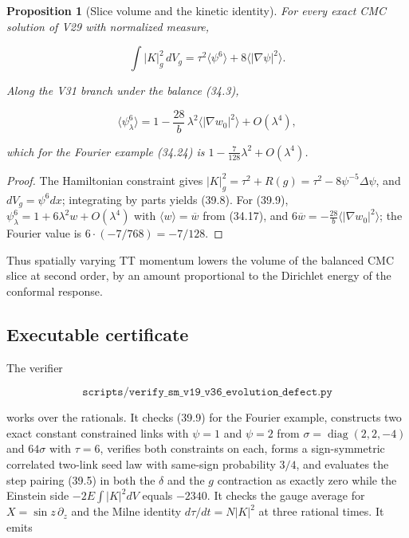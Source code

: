 \documentclass[11pt]{article}
\newtheorem{proposition}[theorem]{Proposition}
\theoremstyle{remark}
\begin{document}
\begin{proposition}[Slice volume and the kinetic identity]
\label{prop:v19v36-volume}
For every exact CMC solution of V29 with normalized measure,

\[
 \int|K|_g^2\,dV_g=\tau^2\langle\psi^6\rangle+8\langle|\nabla\psi|^2\rangle.
                                                                    \tag{39.8}
\]

Along the V31 branch under the balance (34.3),

\[
 \langle\psi_\lambda^6\rangle
 =1-\frac{28}{b}\,\lambda^2\bigl\langle|\nabla w_0|^2\bigr\rangle+O(\lambda^4),
                                                                    \tag{39.9}
\]

which for the Fourier example (34.24) is \(1-\tfrac7{128}\lambda^2+O(\lambda^4)\).
\end{proposition}

\begin{proof}
The Hamiltonian constraint gives
\(|K|_g^2=\tau^2+R(g)=\tau^2-8\psi^{-5}\Delta\psi\), and
\(dV_g=\psi^6dx\); integrating by parts yields (39.8).  For (39.9),
\(\psi_\lambda^6=1+6\lambda^2w+O(\lambda^4)\) with
\(\langle w\rangle=\overline w\) from (34.17), and
\(6\overline w=-\tfrac{28}b\langle|\nabla w_0|^2\rangle\); the Fourier
value is \(6\cdot(-7/768)=-7/128\).
\end{proof}

Thus spatially varying TT momentum lowers the volume of the balanced CMC
slice at second order, by an amount proportional to the Dirichlet energy
of the conformal response.

\subsection{Executable certificate}

The verifier

\[
 \texttt{scripts/verify\_sm\_v19\_v36\_evolution\_defect.py}       \tag{39.10}
\]

works over the rationals.  It checks (39.9) for the Fourier example,
constructs two exact constant constrained links with \(\psi=1\) and
\(\psi=2\) from \(\sigma=\operatorname{diag}(2,2,-4)\) and
\(64\sigma\) with \(\tau=6\), verifies both constraints on each, forms a
sign-symmetric correlated two-link seed law with same-sign probability
\(3/4\), and evaluates the step pairing (39.5) in both the \(\delta\)
and the \(g\) contraction as exactly zero while the Einstein side
\(-2E\int|K|^2dV\) equals \(-2340\).  It checks the gauge average for
\(X=\sin z\,\partial_z\) and the Milne identity
\(d\tau/dt=N|K|^2\) at three rational times.  It emits
\end{document}
